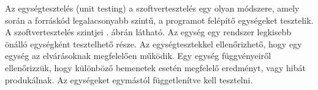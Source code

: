 








Az egységtesztelés (unit testing) a szoftvertesztelés egy olyan módszere, amely során a forráskód legalacsonyabb szintű, a programot felépítő egységeket tesztelik. A szoftvertesztelés szintjei . ábrán látható. Az egység egy rendszer legkisebb önálló egységként tesztelhető része. Az egységtesztekkel ellenőrizhető, hogy egy egység az elvárásoknak megfelelően működik. Egy egység függvényeiről ellenőrizzük, hogy különböző bemenetek esetén megfelelő eredményt, vagy hibát produkálnak. Az egységeket egymástól függetlenítve kell tesztelni.

